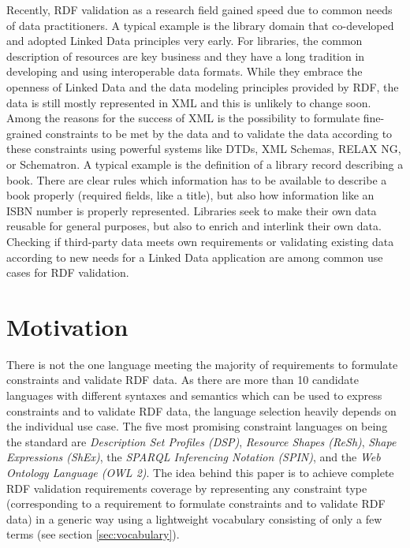 \documentclass{llncs}
\begin{document}
Recently, RDF validation as a research field gained speed due to common needs of data practitioners. A typical example is the library domain that co-developed and adopted Linked Data principles very early. For libraries, the common description of resources are key business and they have a long tradition in developing and using interoperable data formats. While they embrace the openness of Linked Data and the data modeling principles provided by RDF, the data is still mostly represented in XML and this is unlikely to change soon. 
Among the reasons for the success of XML is the possibility to formulate fine-grained constraints to be met by the data and to validate the data according to these constraints using powerful systems like DTDs, XML Schemas, RELAX NG, or Schematron.
A typical example is the definition of a library record describing a book. There are clear rules which information has to be available to describe a book properly (required fields, like a title), but also how information like an ISBN number is properly represented. Libraries seek to make their own data reusable for general purposes, but also to enrich and interlink their own data. Checking if third-party data meets own requirements or validating existing data according to new needs for a Linked Data application are among common use cases for RDF validation.

\section{Motivation}

There is not the one language meeting the majority of requirements to formulate constraints and validate RDF data.
As there are more than 10 candidate languages with different syntaxes and semantics which can be used to express constraints and to validate RDF data, 
the language selection heavily depends on the individual use case.
The five most promising constraint languages on being the standard are
\emph{Description Set Profiles (DSP)},
\emph{Resource Shapes (ReSh)}, 
\emph{Shape Expressions (ShEx)},
the \emph{SPARQL Inferencing Notation (SPIN)}, 
and the \emph{Web Ontology Language (OWL 2)}.
The idea behind this paper is to achieve complete RDF validation requirements coverage by representing any constraint type (corresponding to a requirement to formulate constraints and to validate RDF data) in a generic way using a lightweight vocabulary consisting of only a few terms (see section \ref{sec:vocabulary}).
\end{document}
